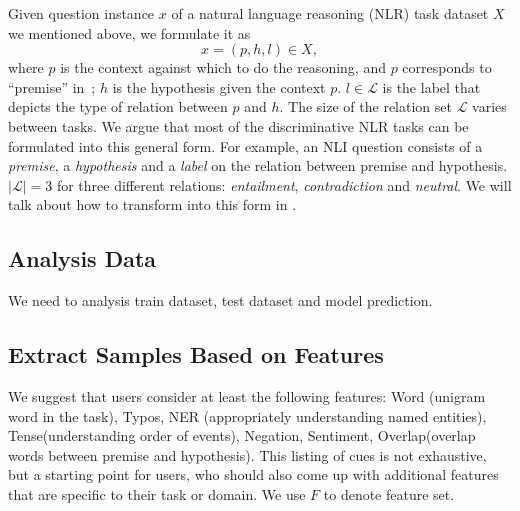 Given question instance $x$ of a natural language reasoning (NLR) task dataset $X$ 
we mentioned above, we formulate it as
\begin{equation}
    x = (p, h, l) \in X,
\end{equation}
\noindent
where $p$ is the context against which to do the reasoning, and $p$ corresponds 
to ``premise'' in~;
$h$ is the hypothesis given the context $p$. $l \in \mathcal{L}$ is the label that 
depicts the type of relation between $p$ and $h$. 
The size of the relation set $\mathcal{L}$ varies between tasks. We argue that 
most of the discriminative NLR tasks can be formulated into this general form. 
For example, an NLI question consists of a \textit{premise}, a \textit{hypothesis} 
and a \textit{label} on the relation between premise and hypothesis. 
$|\mathcal{L}| = 3$ for three different relations: 
\textit{entailment}, \textit{contradiction} and \textit{neutral}. 
We will talk about how to transform into this form in . 

\subsection{Analysis Data}


We need to analysis train dataset, test dataset and model prediction.

\subsection{Extract Samples Based on Features}
\label{sec:extract}

We suggest that users consider at least the following features: Word (unigram word in the task), 
Typos, NER (appropriately understanding named entities), 
Tense(understanding order of events), Negation, 
Sentiment, Overlap(overlap words between premise and hypothesis). 
This listing of cues is not exhaustive, but a starting point for users, 
who should also come up with additional features that are specific 
to their task or domain. We use $F$ to denote feature set.

